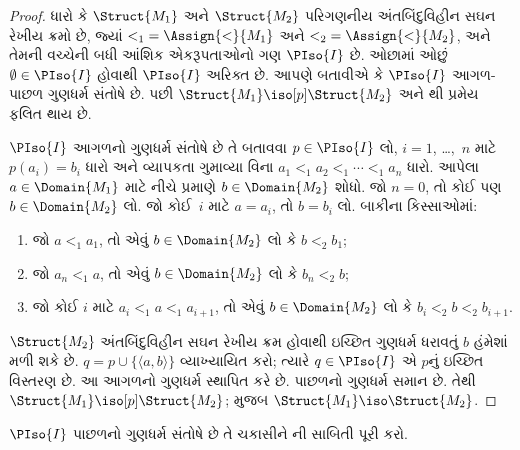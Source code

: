 \begin{proof}
  ધારો કે $\Struct{M_1}$ અને $\Struct{M_2}$ પરિગણનીય
  અંતબિંદુવિહીન સઘન રેખીય ક્રમો છે, જ્યાં ${<_1} = \Assign{<}{M_1}$ અને
  ${<_2} = \Assign{<}{M_2}$, અને તેમની વચ્ચેની બધી આંશિક એકરૂપતાઓનો
  ગણ $\PIso{I}$ છે. ઓછામાં ઓછું $\emptyset \in \PIso{I}$ હોવાથી
  $\PIso{I}$ અરિક્ત છે. આપણે બતાવીએ કે $\PIso{I}$ આગળ-પાછળ ગુણધર્મ
  સંતોષે છે. પછી $\Struct{M_1} \iso[p] \Struct{M_2}$ અને
  થી પ્રમેય ફલિત થાય છે.

  $\PIso{I}$ આગળનો ગુણધર્મ સંતોષે છે તે બતાવવા $p \in \PIso{I}$ લો,
  $i = 1$, \dots,~$n$ માટે $p(a_i) = b_i$ ધારો અને વ્યાપકતા ગુમાવ્યા
  વિના $a_1 <_1 a_2 <_1 \cdots <_1 a_n$ ધારો. આપેલા
  $a \in \Domain{M_1}$ માટે નીચે પ્રમાણે $b \in \Domain{M_2}$ શોધો.
  જો $n=0$, તો કોઈ પણ $b \in \Domain{M_2}$ લો. જો કોઈ~$i$ માટે
  $a=a_i$, તો $b=b_i$ લો. બાકીના કિસ્સાઓમાં:
  \begin{enumerate}
  \item જો $a <_1 a_1$, તો એવું $b \in \Domain{M_2}$ લો કે
    $b <_2 b_1$;
  \item જો $a_n <_1 a$, તો એવું $b \in \Domain{M_2}$ લો કે
    $b_n <_2 b$;
 \item જો કોઈ $i$ માટે $a_i <_1 a <_1 a_{i+1}$, તો એવું
   $b \in \Domain{M_2}$ લો કે $b_i <_2 b <_2 b_{i+1}$.
  \end{enumerate}
  $\Struct{M_2}$ અંતબિંદુવિહીન સઘન રેખીય ક્રમ હોવાથી ઇચ્છિત ગુણધર્મ
  ધરાવતું $b$ હંમેશાં મળી શકે છે. $q = p \cup \{ \langle a, b \rangle \}$
  વ્યાખ્યાયિત કરો; ત્યારે $q \in \PIso{I}$ એ $p$નું ઇચ્છિત વિસ્તરણ છે.
  આ આગળનો ગુણધર્મ સ્થાપિત કરે છે. પાછળનો ગુણધર્મ સમાન છે. તેથી
  $\Struct{M_1} \iso[p] \Struct{M_2}$;  મુજબ
  $\Struct{M_1} \iso \Struct{M_2}$.
\end{proof}

\begin{prob}
  $\PIso{I}$ પાછળનો ગુણધર્મ સંતોષે છે તે ચકાસીને
  ની સાબિતી પૂરી કરો.
\end{prob}

